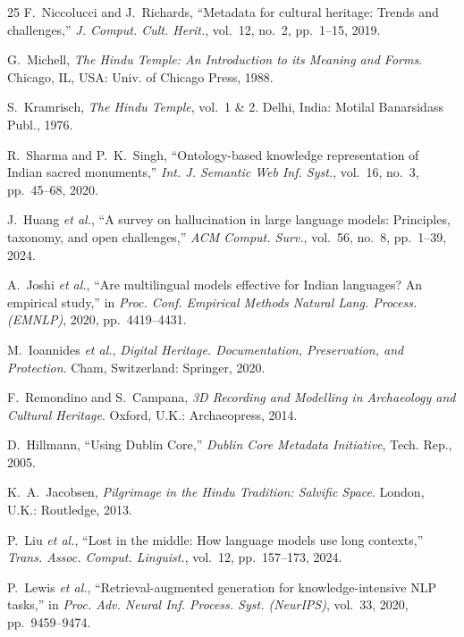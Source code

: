 \documentclass[lettersize,journal]{IEEEtran}
\begin{document}

\begin{thebibliography}{25}
F.~Niccolucci and J.~Richards, ``Metadata for cultural heritage: Trends and challenges,'' \textit{J. Comput. Cult. Herit.}, vol.~12, no.~2, pp.~1--15, 2019.

G.~Michell, \textit{The Hindu Temple: An Introduction to its Meaning and Forms}. Chicago, IL, USA: Univ. of Chicago Press, 1988.

S.~Kramrisch, \textit{The Hindu Temple}, vol.~1 \& 2. Delhi, India: Motilal Banarsidass Publ., 1976.

R.~Sharma and P.~K.~Singh, ``Ontology-based knowledge representation of Indian sacred monuments,'' \textit{Int. J. Semantic Web Inf. Syst.}, vol.~16, no.~3, pp.~45--68, 2020.

J.~Huang \textit{et al.}, ``A survey on hallucination in large language models: Principles, taxonomy, and open challenges,'' \textit{ACM Comput. Surv.}, vol.~56, no.~8, pp.~1--39, 2024.

A.~Joshi \textit{et al.}, ``Are multilingual models effective for Indian languages? An empirical study,'' in \textit{Proc. Conf. Empirical Methods Natural Lang. Process. (EMNLP)}, 2020, pp.~4419--4431.

M.~Ioannides \textit{et al.}, \textit{Digital Heritage. Documentation, Preservation, and Protection}. Cham, Switzerland: Springer, 2020.

F.~Remondino and S.~Campana, \textit{3D Recording and Modelling in Archaeology and Cultural Heritage}. Oxford, U.K.: Archaeopress, 2014.

D.~Hillmann, ``Using Dublin Core,'' \textit{Dublin Core Metadata Initiative}, Tech. Rep., 2005.

K.~A.~Jacobsen, \textit{Pilgrimage in the Hindu Tradition: Salvific Space}. London, U.K.: Routledge, 2013.

P.~Liu \textit{et al.}, ``Lost in the middle: How language models use long contexts,'' \textit{Trans. Assoc. Comput. Linguist.}, vol.~12, pp.~157--173, 2024.

P.~Lewis \textit{et al.}, ``Retrieval-augmented generation for knowledge-intensive NLP tasks,'' in \textit{Proc. Adv. Neural Inf. Process. Syst. (NeurIPS)}, vol.~33, 2020, pp.~9459--9474.


\end{thebibliography}
\end{document}
